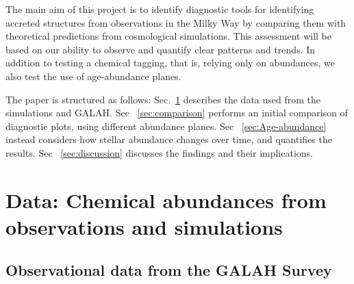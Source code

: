 \documentclass[fleqn,usenatbib]{mnras}
\begin{document}


The main aim of this project is to identify diagnostic tools for identifying accreted structures from observations in the Milky Way by comparing them with theoretical predictions from cosmological simulations. This assessment will be based on our ability to observe and quantify clear patterns and trends. In addition to testing a chemical tagging, that is, relying only on abundances, we also test the use of age-abundance planes.\par

The paper is structured as follows: Sec.~\ref{sec:data} describes the data used from the simulations and GALAH. Sec ~\ref{sec:comparison} performs an initial comparison of diagnostic plots, using different abundance planes. Sec ~\ref{sec:Age-abundance} instead considers how stellar abundance changes over time, and quantifies the results. Sec ~\ref{sec:discussion} discusses the findings and their implications.

\section{Data: Chemical abundances from observations and simulations} \label{sec:data}

\subsection{Observational data from the GALAH Survey}\label{sec:obs_data}
\end{document}
